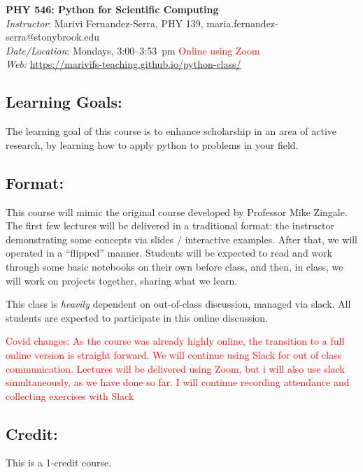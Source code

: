 \documentclass[11pt]{article}
\begin{document}
\begin{center}
{\LARGE \sffamily \bfseries PHY 546: Python for Scientific Computing} \\[3mm]
{\em Instructor}\/: Marivi Fernandez-Serra, PHY 139, maria.fernandez-serra@stonybrook.edu \\
{\em Date/Location}\/: Mondays, 3:00--3:53~pm \textcolor{red}{Online using Zoom}  \\
{\em Web:}\/ \url{https://marivifs-teaching.github.io/python-class/}
\end{center}

\subsection*{Learning Goals:}

The learning goal of this course is to enhance scholarship in an area
of active research, by learning how to apply python to problems
in your field.


\subsection*{Format:}

This course will mimic the original course developed by Professor
Mike Zingale.
The first few lectures will be delivered in a traditional format: the
instructor demonstrating some concepts via slides / interactive
examples.  After that, we will operated in a ``flipped'' manner.
Students will be expected to read and work through some basic
notebooks on their own before class, and then, in class, we will work
on projects together, sharing what we learn.

This class is {\em heavily} dependent on out-of-class discussion,
managed via slack.  All students are expected to participate in this
online discussion.

\textcolor{red}{Covid changes: As the course was already highly online,
the transition to a full online version is straight forward.
We will continue using Slack for out of class communication.
Lectures will be delivered using Zoom, but i will also use slack
simultaneously, as we have done so far.
I will continue recording attendance and collecting exercises with Slack}

\subsection*{Credit:}

This is a 1-credit course.
\end{document}
